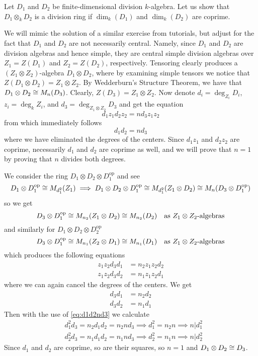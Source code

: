 \documentclass[a4paper, 12pt]{article}
\begin{document}
\begin{Exercise}
    Let $D_1$ and $D_2$ be finite-dimensional division $k$-algebra.
    Let us show that $D_1 \otimes_k D_2$ is a division ring
    if $\dim_k(D_1)$ and $\dim_k(D_2)$ are coprime.

    We will mimic the solution of a similar exercise from tutorials,
    but adjust for the fact that $D_1$ and $D_2$ are not necessarily central.
    Namely, since $D_1$ and $D_2$ are division algebras and hence simple,
    they are central simple division algebras over $Z_1 = Z(D_1)$ and $Z_2 = Z(D_2)$, respectively.
    Tensoring clearly produces a $(Z_1\otimes Z_2)$-algebra $D_1 \otimes D_2$,
    where by examining simple tensors we notice that $Z(D_1 \otimes D_2) = Z_1 \otimes Z_2$.
    By Wedderburn's Structure Theorem, we have that $D_1 \otimes D_2 \cong M_n(D_3)$.
    Clearly, $Z(D_3) = Z_1 \otimes Z_2$.
    Now denote $d_i = \deg_{Z_i}D_i$, $z_i = \deg_k Z_i$, and $d_3 = \deg_{Z_1\otimes Z_2} D_3$
    and get the equation
    \[
        d_1 z_1 d_2 z_2 = n d_3 z_1 z_2
    \]
    from which immediately follows
    \begin{equation}
        \label{eq:d1d2nd3}
        d_1 d_2 = n d_3
    \end{equation}
    where we have eliminated the degrees of the centers.
    Since $d_1 z_1$ and $d_2 z_2$ are coprime, necessarily $d_1$ and $d_2$ are coprime as well,
    and we will prove that $n = 1$ by proving that $n$ divides both degrees.

    We consider the ring $D_1 \otimes D_2 \otimes D_1^{\text{op}}$ and see
    \[
        D_1 \otimes D_1^{\text{op}} \cong M_{d_1^2}(Z_1) \implies D_1 \otimes D_2 \otimes D_1^{\text{op}} \cong M_{d_1^2}(Z_1 \otimes D_2) \cong M_{n}(D_3 \otimes D_1^{\text{op}})
    \]
    so we get
    \[
        D_3 \otimes D_1^{\text{op}} \cong M_{n_2}(Z_1 \otimes D_2) \cong M_{n_2}(D_2) \text{\quad as $Z_1\otimes Z_2$-algebras}
    \]
    and similarly for $D_1 \otimes D_2 \otimes D_2^{\text{op}}$
    \[
        D_3 \otimes D_1^{\text{op}} \cong M_{n_1}(Z_2 \otimes D_1) \cong M_{n_1}(D_1) \text{\quad as $Z_1\otimes Z_2$-algebras}
    \]
    which produces the following equations
    \begin{align*}
        z_1 z_2 d_3 d_1 &= n_2 z_1 z_2 d_2 \\
        z_1 z_2 d_3 d_2 &= n_1 z_1 z_2 d_1
    \end{align*}
    where we can again cancel the degrees of the centers.
    We get
    \begin{align*}
        d_3 d_1 &= n_2 d_2 \\
        d_3 d_2 &= n_1 d_1
    \end{align*}
    Then with the use of \eqref{eq:d1d2nd3} we calculate
    \begin{align*}
        &d_1^2d_3 = n_2 d_1 d_2 = n_2 n d_3 \implies d_1^2 = n_2 n \implies n|d_1^2 \\
        &d_2^2d_3 = n_1 d_1 d_2 = n_1 n d_3 \implies d_2^2 = n_1 n \implies n|d_2^2
    \end{align*}
    Since $d_1$ and $d_2$ are coprime, so are their squares,
    so $n = 1$ and $D_1 \otimes D_2 \cong D_3$.
\end{Exercise}
\end{document}
